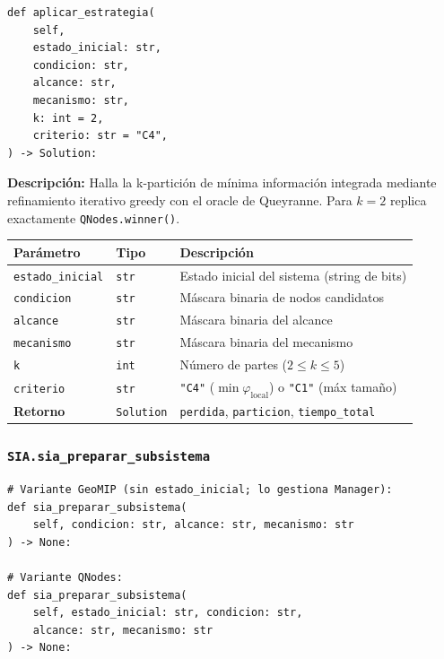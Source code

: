 \begin{lstlisting}
def aplicar_estrategia(
    self,
    estado_inicial: str,
    condicion: str,
    alcance: str,
    mecanismo: str,
    k: int = 2,
    criterio: str = "C4",
) -> Solution:
\end{lstlisting}

\textbf{Descripción:} Halla la k-partición de mínima información integrada
mediante refinamiento iterativo greedy con el oracle de Queyranne. Para $k=2$
replica exactamente \texttt{QNodes.winner()}.

\begin{table}[H]
\centering
\begin{tabular}{llp{5.5cm}}
  \toprule
  \textbf{Parámetro} & \textbf{Tipo} & \textbf{Descripción} \\
  \midrule
  \texttt{estado\_inicial} & \texttt{str}      & Estado inicial del sistema (string de bits) \\
  \texttt{condicion}       & \texttt{str}      & Máscara binaria de nodos candidatos \\
  \texttt{alcance}         & \texttt{str}      & Máscara binaria del alcance \\
  \texttt{mecanismo}       & \texttt{str}      & Máscara binaria del mecanismo \\
  \texttt{k}               & \texttt{int}      & Número de partes ($2 \le k \le 5$) \\
  \texttt{criterio}        & \texttt{str}      & \texttt{"C4"} ($\min\varphi_{\text{local}}$) o \texttt{"C1"} (máx tamaño) \\
  \midrule
  \textbf{Retorno}         & \texttt{Solution} & \texttt{perdida}, \texttt{particion}, \texttt{tiempo\_total} \\
  \bottomrule
\end{tabular}
\end{table}

\subsubsection*{\texttt{SIA.sia\_preparar\_subsistema}}

\begin{lstlisting}
# Variante GeoMIP (sin estado_inicial; lo gestiona Manager):
def sia_preparar_subsistema(
    self, condicion: str, alcance: str, mecanismo: str
) -> None:

# Variante QNodes:
def sia_preparar_subsistema(
    self, estado_inicial: str, condicion: str,
    alcance: str, mecanismo: str
) -> None:
\end{lstlisting}

